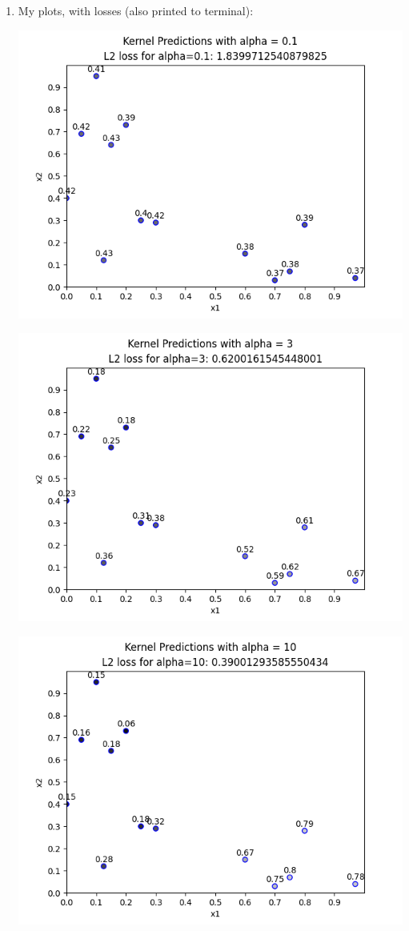 \documentclass[submit]{harvardml}
\begin{document}
\begin{enumerate}
    \item My plots, with losses (also printed to terminal):

    \includegraphics[scale=0.6]{alpha0.1.png}

    \includegraphics[scale=0.6]{alpha3.png}

    \includegraphics[scale=0.6]{alpha10.png}


\end{enumerate}
\end{document}
